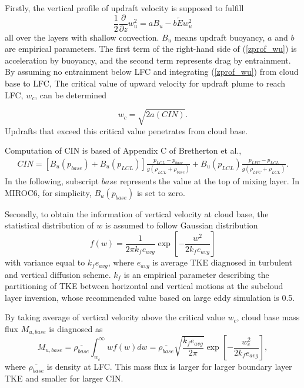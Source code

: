 Firstly, the vertical profile of updraft velocity is supposed to fulfill 
\begin{equation}\label{zprof_wu}
    \frac{1}{2}\frac{\partial}{\partial z}w_u^2=aB_u-b\tilde{E} w_u^2
\end{equation}
all over the layers with shallow convection. $B_u$ means updraft buoyancy, $a$ and $b$ are empirical parameters. 
The first term of the right-hand side of (\ref{zprof_wu}) is acceleration by buoyancy, and the second term represents drag by entrainment.
By assuming no entrainment below LFC and integrating (\ref{zprof_wu}) from cloud base to LFC, The critical value of upward velocity for updraft plume to reach LFC, $w_c$, can be determined

\begin{equation}\label{wc}
    w_c = \sqrt{2a(CIN)}.
\end{equation}
Updrafts that exceed this critical value penetrates from cloud base.

Computation of CIN is based of Appendix C of Bretherton et al., 
\begin{align}\label{def_CIN}
    CIN = [B_u(p_{base}) + B_u(p_{LCL})]\frac{p_{LCL}-p_{base}}{g(\rho_{LCL}+\rho_{base})} + B_u(p_{LCL})\frac{p_{LFC}-p_{LCL}}{g(\rho_{LFC}+\rho_{LCL})}.
\end{align}
In the following, subscript $\mathit{base}$ represents the value at the top of mixing layer. 
In MIROC6, for simplicity, $B_u(p_{base})$ is set to zero.

Secondly, to obtain the information of vertical velocity at cloud base, the statistical distribution of $w$ is assumed to follow Gaussian distribution
\begin{equation}\label{distr_w}
    f(w) = \frac{1}{2\pi k_f e_{avg}}\exp\left[ -\frac{w^2}{2k_fe_{avg}}\right]
\end{equation}
with variance equal to $k_f e_{avg}$, where $e_{avg}$ is average TKE diagnosed in turbulent and vertical diffusion scheme.
$k_f$ is an empirical parameter describing the partitioning of TKE between horizontal and vertical motions at the subcloud layer inversion, whose recommended value based on large eddy simulation is 0.5.

By taking average of vertical velocity above the critical value $w_c$, cloud base mass flux $M_{u,base}$ is diagnosed as
\begin{equation}\label{Mubase}
    M_{u,base}=\overline{\rho_{base}}\int_{w_c}^{\infty}wf(w)dw =\overline{\rho_{base}}\sqrt{\frac{k_f e_{avg}}{2\pi}}\exp\left[-\frac{w_c^2}{2k_fe_{avg}}\right],
\end{equation}
where $\overline{\rho_{base}}$ is density at LFC.
This mass flux is larger for larger boundary layer TKE and smaller for larger CIN.

